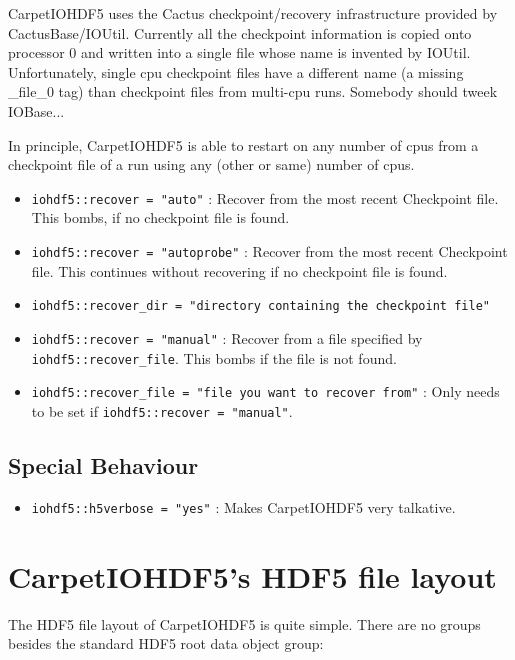 CarpetIOHDF5 uses the Cactus checkpoint/recovery infrastructure provided by
CactusBase/IOUtil. Currently all the checkpoint information is copied onto processor 0 and
 written into a single file whose name is invented by IOUtil. Unfortunately, single cpu
checkpoint files have a different name (a missing \_file\_0 tag) than checkpoint
files from multi-cpu runs. Somebody should tweek IOBase... 

In principle, CarpetIOHDF5 is able to restart on any number
of cpus  from a checkpoint file of a run using any (other or same) number of cpus.

\begin{itemize}
  \item {\tt iohdf5::recover = "auto"} : Recover from the most recent Checkpoint file. This bombs,
    if no checkpoint file is found.
  \item {\tt iohdf5::recover = "autoprobe"} : Recover from the most recent Checkpoint file. This continues
    without recovering if no checkpoint file is found.
  \item {\tt iohdf5::recover\_dir = "directory containing the checkpoint file"} 
  \item {\tt iohdf5::recover = "manual"} : Recover from a file specified by {\tt iohdf5::recover\_file}. This
     bombs if the file is not found.
  \item {\tt iohdf5::recover\_file = "file you want to recover from"} : Only needs to be set if
    {\tt iohdf5::recover = "manual"}.

\end{itemize}



\subsection{Special Behaviour}

\begin{itemize}
  \item {\tt iohdf5::h5verbose = "yes"} : Makes CarpetIOHDF5 very talkative.
\end{itemize}


\section{CarpetIOHDF5's HDF5 file layout}

The HDF5 file layout of CarpetIOHDF5 is quite simple. There are no groups besides the 
standard HDF5 root data object group:

